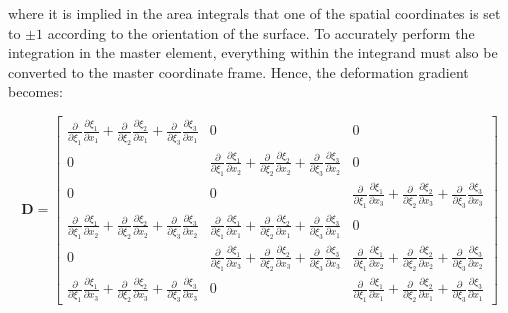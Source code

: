 \documentclass[10pt]{article}
\begin{document}
where it is implied in the area integrals that one of the spatial coordinates is set to \(\pm 1\) according to the orientation of the surface. To accurately perform the integration in the master element, everything within the integrand must also be converted to the master coordinate frame. Hence, the deformation gradient becomes:

\begin{equation}
\label{eq:D}
\textbf{D}=\begin{bmatrix}\frac{\partial}{\partial\xi_1}\frac{\partial\xi_1}{\partial x_1}+\frac{\partial}{\partial\xi_2}\frac{\partial\xi_2}{\partial x_1}+\frac{\partial}{\partial\xi_3}\frac{\partial\xi_3}{\partial x_1} & 0 & 0\\
0 & \frac{\partial}{\partial\xi_1}\frac{\partial\xi_1}{\partial x_2}+\frac{\partial}{\partial\xi_2}\frac{\partial\xi_2}{\partial x_2}+\frac{\partial}{\partial\xi_3}\frac{\partial\xi_3}{\partial x_2} & 0\\
0 & 0 & \frac{\partial}{\partial\xi_1}\frac{\partial\xi_1}{\partial x_3}+\frac{\partial}{\partial\xi_2}\frac{\partial\xi_2}{\partial x_3}+\frac{\partial}{\partial\xi_3}\frac{\partial\xi_3}{\partial x_3}\\
\frac{\partial}{\partial\xi_1}\frac{\partial\xi_1}{\partial x_2}+\frac{\partial}{\partial\xi_2}\frac{\partial\xi_2}{\partial x_2}+\frac{\partial}{\partial\xi_3}\frac{\partial\xi_3}{\partial x_2} & \frac{\partial}{\partial\xi_1}\frac{\partial\xi_1}{\partial x_1}+\frac{\partial}{\partial\xi_2}\frac{\partial\xi_2}{\partial x_1}+\frac{\partial}{\partial\xi_3}\frac{\partial\xi_3}{\partial x_1} & 0\\
0 & \frac{\partial}{\partial\xi_1}\frac{\partial\xi_1}{\partial x_3}+\frac{\partial}{\partial\xi_2}\frac{\partial\xi_2}{\partial x_3}+\frac{\partial}{\partial\xi_3}\frac{\partial\xi_3}{\partial x_3} & \frac{\partial}{\partial\xi_1}\frac{\partial\xi_1}{\partial x_2}+\frac{\partial}{\partial\xi_2}\frac{\partial\xi_2}{\partial x_2}+\frac{\partial}{\partial\xi_3}\frac{\partial\xi_3}{\partial x_2}\\
\frac{\partial}{\partial\xi_1}\frac{\partial\xi_1}{\partial x_3}+\frac{\partial}{\partial\xi_2}\frac{\partial\xi_2}{\partial x_3}+\frac{\partial}{\partial\xi_3}\frac{\partial\xi_3}{\partial x_3} & 0 & \frac{\partial}{\partial\xi_1}\frac{\partial\xi_1}{\partial x_1}+\frac{\partial}{\partial\xi_2}\frac{\partial\xi_2}{\partial x_1}+\frac{\partial}{\partial\xi_3}\frac{\partial\xi_3}{\partial x_1}\end{bmatrix}
\end{equation}
\end{document}

